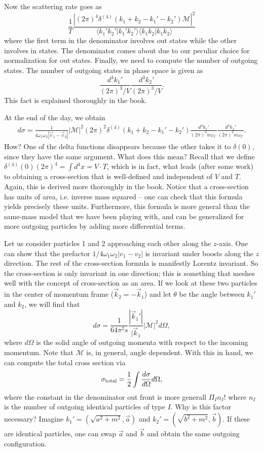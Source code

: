 \documentclass{../mathnotes}
\begin{document}
Now the scattering rate goes as
\[\frac{1}{T}\frac{|(2\pi)^4\delta^{(4)}(k_1+k_2-k_1'-k_2')\mathcal{M}|^2}{\langle k_1'k_2'|k_1'k_2'\rangle\langle k_1k_2|k_1k_2\rangle}\]
where the first term in the denominator involves out states while the other involves in states. The denominator comes about
due to our peculiar choice for normalization for out states. Finally, we need to compute the number of outgoing states. 
The number of outgoing states in phase space is given as
\[\frac{d^3k_1'}{(2\pi)^3/V}\frac{d^3k_2'}{(2\pi)^3/V}.\]
This fact is explained thoroughly in the book.

At the end of the day, we obtain
\begin{align*}
    d\sigma=\frac{1}{4\omega_1\omega_2|\vec{v}_1-\vec{v}_2|}|\mathcal{M}|^2(2\pi)^2\delta^{(4)}(k_1+k_2-k_1'-k_2')\frac{d^3k_1'}{(2\pi)^3w\omega_{1'}}\frac{d^3k_1'}{(2\pi)^3w\omega_{2'}}.
\end{align*}
How? One of the delta functions disappears because the other takes it to $\delta(0)$, since they have the same argument.
What does this mean? Recall that we define $\delta^{(4)}(0)(2\pi)^4=\int d^4x=V\cdot T$, which is in fact, what leads (after some work)
to obtaining a cross-section that is well-defined and independent of $V$ and $T$. Again, this is derived more thoroughly in the book.
Notice that a cross-section has units of area, i.e. inverse mass squared -- one can check that this formula yields precisely these units.
Furthermore, this formula is more general than the same-mass model that we have been playing with, and can be generalized for more outgoing
particles by adding more differential terms.

Let us consider particles 1 and 2 approaching each other along the $z$-axis. One can show that the prefactor $1/4\omega_1\omega_2|v_1-v_2|$
is invariant under boosts along the $z$ direction. The rest of the cross-section formula is manifestly Lorentz invariant. So the cross-section
is only invariant in one direction; this is something that meshes well with the concept of cross-section as an area. If we look at these
two particles in the center of momentum frame ($\vec{k}_2=-\vec{k}_1$) and let $\theta$ be the angle between $k_1'$ and $k_2$, we will find that
\[d\sigma=\frac{1}{64\pi^2s}\frac{|\vec{k}_1'|}{|\vec{k}_1}|\mathcal{M}|^2d\Omega,\]
where $d\Omega$ is the solid angle of outgoing momenta with respect to the incoming momentum. Note that $\mathcal{M}$ is, in general,
angle dependent. With this in hand, we can compute the total cross section via
\[\sigma_{\rm total}=\frac{1}{2}\int \frac{d\sigma}{d\Omega}d\Omega,\]
where the constant in the denominator out front is more generall $\Pi_I n_I!$ where $n_I$ is the number of outgoing identical particles of
type $I$. Why is this factor necessary? Imagine $k_1'=(\sqrt{a^2+m^2},\vec{a})$ and $k_2'=(\sqrt{b^2+m^2},\vec{b})$. If these are identical particles,
one can swap $\vec{a}$ and $\vec{b}$ and obtain the same outgoing configuration.
\end{document}
